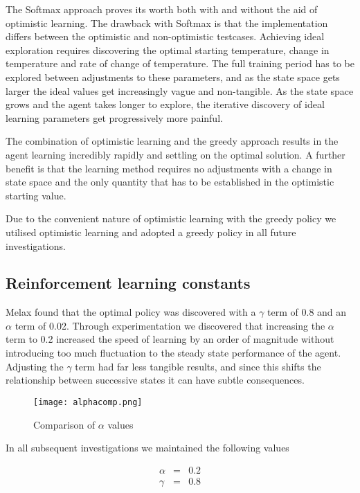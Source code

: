 \documentclass{rucsthesis}
\begin{document}
The Softmax approach proves its worth both with and without the aid of optimistic learning. The drawback with Softmax is that the implementation differs between the optimistic and non-optimistic testcases. Achieving ideal exploration requires discovering the optimal starting temperature, change in temperature and rate of change of temperature. The full training period has to be explored between adjustments to these parameters, and as the state space gets larger the ideal values get increasingly vague and non-tangible. As the state space grows and the agent takes longer to explore, the iterative discovery of ideal learning parameters get progressively more painful.

The combination of optimistic learning and the greedy approach results in the agent learning incredibly rapidly and settling on the optimal solution. A further benefit is that the learning method requires no adjustments with a change in state space and the only quantity that has to be established in the optimistic starting value.

Due to the convenient nature of optimistic learning with the greedy policy we utilised optimistic learning and adopted a greedy policy in all future investigations.

\subsection{Reinforcement learning constants}

Melax found that the optimal policy was discovered with a $\gamma$ term of 0.8 and an $\alpha$ term of 0.02. Through experimentation we discovered that increasing the $\alpha$ term to 0.2 increased the speed of learning by an order of magnitude without introducing too much fluctuation to the steady state performance of the agent. Adjusting the $\gamma$ term had far less tangible results, and since this shifts the relationship between successive states it can have subtle consequences.

\begin{figure}[h]
\centering
\texttt{[image: alphacomp.png]}
\caption{Comparison of $\alpha$ values}
\label{fig:alpha}
\end{figure} 

In all subsequent investigations we maintained the following values

\begin{eqnarray*}
\alpha & = & 0.2 \\
\gamma & = & 0.8
\end{eqnarray*}
\end{document}
